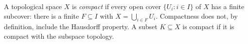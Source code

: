 
A topological space $X$ is \emph{compact} if every open cover $\{U_i:i\in I\}$ of $X$ has a finite subcover: there is a finite $F\subseteq I$ with $X=\bigcup_{i\in F}U_i$. Compactness does not, by definition, include the Hausdorff property. A subset $K\subseteq X$ is compact if it is compact with the subspace topology.
